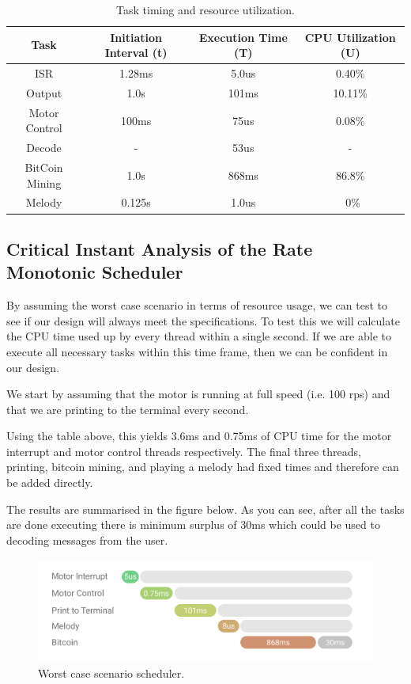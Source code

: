 \documentclass{article}
\begin{document}
\begin{table}[ht]
\centering                      %
\begin{tabular}{c c c c}        %
Task & Initiation Interval (t) & Execution Time (T) & CPU Utilization (U) \\ [0.5ex]   %
\hline                          %
ISR & 1.28ms & 5.0us & 0.40\% \\           %
Output & 1.0s & 101ms & 10.11\% \\
Motor Control & 100ms & 75us  & 0.08\% \\
Decode & - & 53us & - \\
BitCoin Mining & 1.0s & 868ms & 86.8\% \\
Melody & 0.125s & 1.0us & ~0\% \\[1ex]     %
\end{tabular}
\caption{Task timing and resource utilization.}
\label{table:nonlin}            %
\end{table}


\subsection{Critical Instant Analysis of the Rate Monotonic Scheduler}

\noindent
By assuming the worst case scenario in terms of resource usage, we can test to see if our design will always meet the specifications.
To test this we will calculate the CPU time used up by every thread within a single second. If we are able to execute all necessary tasks within this time frame, then we can be confident in our design.

\bigskip

\noindent
We start by assuming that the motor is running at full speed (i.e. 100 rps) and that we are printing to the terminal every second.

\bigskip

\noindent
Using the table above, this yields 3.6ms and 0.75ms of CPU time for the motor interrupt and motor control threads respectively.
The final three threads, printing, bitcoin mining, and playing a melody had fixed times and therefore can be added directly.

\bigskip

\noindent
The results are summarised in the figure below. As you can see, after all the tasks are done executing there is minimum surplus of 30ms which could be used to decoding messages from the user.


\begin{figure}[H]
\begin{center}
   \includegraphics[width=0.9\linewidth]{scheduler.png}
\end{center}
   \caption{Worst case scenario scheduler.}
\label{fig:long}
\label{fig:onecol}
\end{figure}
\end{document}
